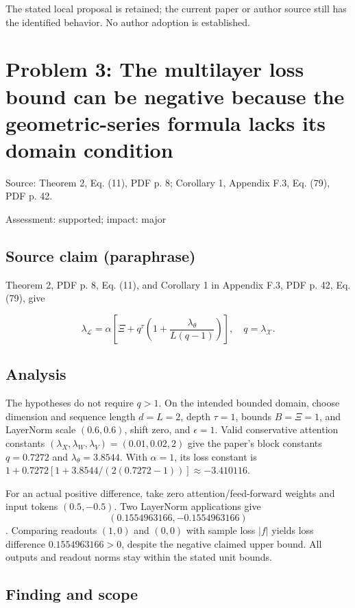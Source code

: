 \documentclass[11pt]{article}
\begin{document}
The stated local proposal is retained; the current paper or author source still has the identified behavior. No author adoption is established.

\section*{Problem 3: The multilayer loss bound can be negative because the geometric-series formula lacks its domain condition}

Source: Theorem 2, Eq. (11), PDF p. 8; Corollary 1, Appendix F.3, Eq. (79), PDF p. 42.

Assessment: supported; impact: major

\subsection*{Source claim (paraphrase)}

Theorem 2, PDF p. 8, Eq. (11), and Corollary 1 in Appendix F.3, PDF p. 42, Eq. (79), give

\[ \lambda_{\mathcal L}=\alpha\left[\Xi+q^\tau\left(1+ \frac{\lambda_\theta}{L(q-1)}\right)\right], \quad q=\lambda_{\mathcal X}. \]

\subsection*{Analysis}

The hypotheses do not require \(q>1\). On the intended bounded domain, choose dimension and sequence length \(d=L=2\), depth \(\tau=1\), bounds \(B=\Xi=1\), and LayerNorm scale \((0.6,0.6)\), shift zero, and \(\epsilon=1\). Valid conservative attention constants \((\lambda_X,\lambda_W,\lambda_V)=(0.01,0.02,2)\) give the paper's block constants \(q=0.7272\) and \(\lambda_\theta=3.8544\). With \(\alpha=1\), its loss constant is \(1+0.7272[1+3.8544/(2(0.7272-1))]\approx-3.410116\).

For an actual positive difference, take zero attention/feed-forward weights and input tokens \((0.5,-0.5)\). Two LayerNorm applications give \[(0.1554963166,-0.1554963166)\]. Comparing readouts \((1,0)\) and \((0,0)\) with sample loss \(|f|\) yields loss difference \(0.1554963166>0\), despite the negative claimed upper bound. All outputs and readout norms stay within the stated unit bounds.

\subsection*{Finding and scope}
\end{document}
